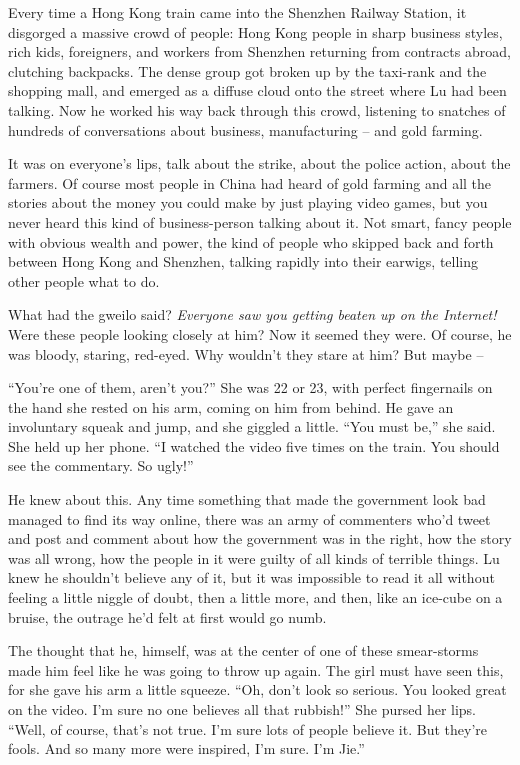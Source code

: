 Every time a Hong Kong train came into the Shenzhen Railway
Station, it disgorged a massive crowd of people: Hong Kong people
in sharp business styles, rich kids, foreigners, and workers from
Shenzhen returning from contracts abroad, clutching backpacks. The
dense group got broken up by the taxi-rank and the shopping mall,
and emerged as a diffuse cloud onto the street where Lu had been
talking. Now he worked his way back through this crowd, listening
to snatches of hundreds of conversations about business,
manufacturing -- and gold farming.

It was on everyone's lips, talk about the strike, about the police
action, about the farmers. Of course most people in China had heard
of gold farming and all the stories about the money you could make
by just playing video games, but you never heard this kind of
business-person talking about it. Not smart, fancy people with
obvious wealth and power, the kind of people who skipped back and
forth between Hong Kong and Shenzhen, talking rapidly into their
earwigs, telling other people what to do.

What had the gweilo said?
\emph{Everyone saw you getting beaten up on the Internet!} Were
these people looking closely at him? Now it seemed they were. Of
course, he was bloody, staring, red-eyed. Why wouldn't they stare
at him? But maybe --

``You're one of them, aren't you?'' She was 22 or 23, with perfect
fingernails on the hand she rested on his arm, coming on him from
behind. He gave an involuntary squeak and jump, and she giggled a
little. ``You must be,'' she said. She held up her phone. ``I watched
the video five times on the train. You should see the commentary.
So ugly!''

He knew about this. Any time something that made the government
look bad managed to find its way online, there was an army of
commenters who'd tweet and post and comment about how the
government was in the right, how the story was all wrong, how the
people in it were guilty of all kinds of terrible things. Lu knew
he shouldn't believe any of it, but it was impossible to read it
all without feeling a little niggle of doubt, then a little more,
and then, like an ice-cube on a bruise, the outrage he'd felt at
first would go numb.

The thought that he, himself, was at the center of one of these
smear-storms made him feel like he was going to throw up again. The
girl must have seen this, for she gave his arm a little squeeze.
``Oh, don't look so serious. You looked great on the video. I'm sure
no one believes all that rubbish!'' She pursed her lips. ``Well, of
course, that's not true. I'm sure lots of people believe it. But
they're fools. And so many more were inspired, I'm sure. I'm Jie.''

